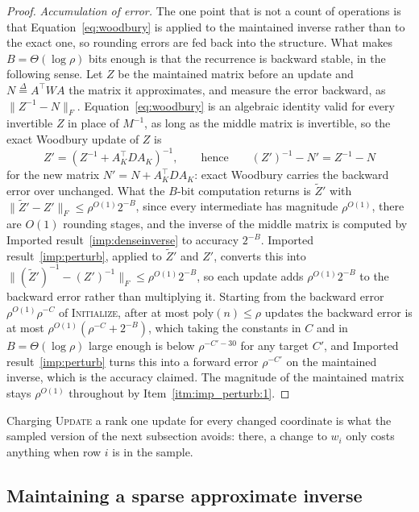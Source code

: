 \documentclass[11pt]{article}
\newcommand{\defeq}{\stackrel{\Delta}{=}}
\begin{document}
\begin{proof}
\emph{Accumulation of error.}
The one point that is not a count of operations is that
Equation~\eqref{eq:woodbury} is applied to the maintained inverse rather than to
the exact one, so rounding errors are fed back into the structure.
What makes $B = \Theta(\log \rho)$ bits enough is that the recurrence is
backward stable, in the following sense.
Let $Z$ be the maintained matrix before an update and
$N \defeq A^\top W A$ the matrix it approximates, and measure the error
backward, as $\|Z^{-1} - N\|_F$.
Equation~\eqref{eq:woodbury} is an algebraic identity valid for every invertible
$Z$ in place of
$M^{-1}$, as long as the middle matrix is invertible, so the exact Woodbury
update of $Z$ is
\[
Z'
=
\left( Z^{-1} + A_K^\top D A_K \right)^{-1},
\qquad\text{hence}\qquad
(Z')^{-1} - N'
=
Z^{-1} - N
\]
for the new matrix $N' = N + A_K^\top D A_K$: exact Woodbury carries the
backward error over unchanged.
What the $B$-bit computation returns is
$\widetilde{Z}'$ with
$\|\widetilde{Z}' - Z'\|_F \le \rho^{O(1)} 2^{-B}$, since every intermediate has
magnitude $\rho^{O(1)}$, there are
$O(1)$ rounding stages, and the inverse of the middle matrix is computed by
Imported result~\ref{imp:denseinverse} to accuracy $2^{-B}$.
Imported result~\ref{imp:perturb}, applied to $\widetilde{Z}'$ and
$Z'$, converts this into
$\|(\widetilde{Z}')^{-1} - (Z')^{-1}\|_F \le \rho^{O(1)} 2^{-B}$, so each update
adds $\rho^{O(1)} 2^{-B}$ to the backward error rather than multiplying it.
Starting from the backward error $\rho^{O(1)} \rho^{-C}$ of \textsc{Initialize},
after at most $\mathrm{poly}(n) \le \rho$ updates the backward error is at most
$\rho^{O(1)} (\rho^{-C} + 2^{-B})$, which taking the constants in
$C$ and in
$B = \Theta(\log \rho)$ large enough is below
$\rho^{-C' - 30}$ for any target
$C'$, and Imported result~\ref{imp:perturb} turns this into a forward error
$\rho^{-C'}$ on the maintained inverse, which is the accuracy claimed.
The magnitude of the maintained matrix stays $\rho^{O(1)}$ throughout by
Item~\ref{itm:imp_perturb:1}.
\end{proof}

Charging \textsc{Update} a rank one update for every changed coordinate is what
the sampled version of the next subsection avoids: there, a change to $w_i$ only
costs anything when row $i$ is in the sample.

\subsection{Maintaining a sparse approximate inverse}
\label{subsec:sample_maintain}
\end{document}
